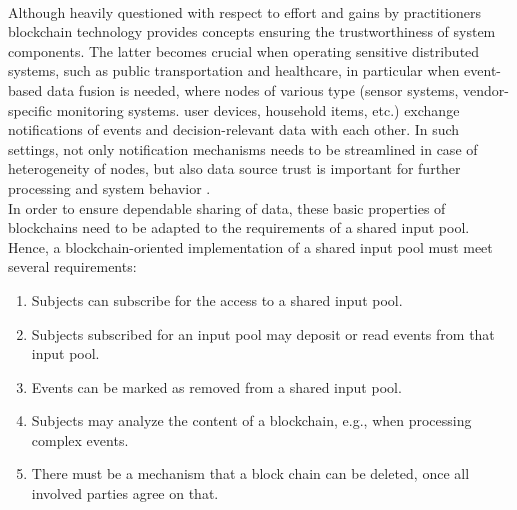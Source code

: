 \\
Although heavily questioned with respect to effort and gains by practitioners \cite{article:BlockchainUniverse} blockchain technology provides concepts ensuring the trustworthiness of system components. The latter becomes crucial when operating sensitive distributed systems, such as public transportation and healthcare, in particular when event-based data fusion is needed, where nodes of various type (sensor systems, vendor-specific monitoring systems. user devices, household items, etc.) exchange notifications of events and decision-relevant data with each other. In such settings, not only notification mechanisms needs to be streamlined in case of heterogeneity of nodes, but also data source trust is important for further processing and system behavior \cite{article:EventbasedSensor}.
\\ 
In order to ensure dependable sharing of data, these basic properties of blockchains need to be adapted to the requirements of a shared input pool. Hence, a blockchain-oriented implementation of a shared input pool must meet several requirements:
\begin{enumerate}
	\item Subjects can subscribe for the access to a shared input pool.
	\item Subjects subscribed for an input pool may deposit or read events from that input pool. 
	\item Events can be marked as removed from a shared input pool.
	\item Subjects may analyze the content of a blockchain, e.g., when processing complex events.
	\item There must be a mechanism that a block chain can be deleted, once all involved parties agree on that.
\end{enumerate}

